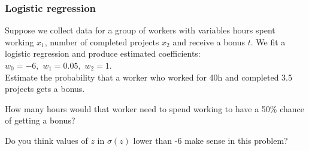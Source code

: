 \subsubsection{Logistic regression}
    Suppose we collect data for a group of workers with variables hours spent working $x_1$, number of completed projects $x_2$ and receive a bonus $t$. We fit a logistic regression and produce estimated coefficients: $w_0=-6,\,\,w_1=0.05,\,\,w_2=1$.\\
    Estimate the probability that a worker who worked for 40h and completed 3.5 projects gets a bonus.


    How many hours would that worker need to spend working to have a 50\% chance of getting a bonus?


    Do you think values of $z$ in $\sigma(z)$ lower than -6 make sense in this problem?


